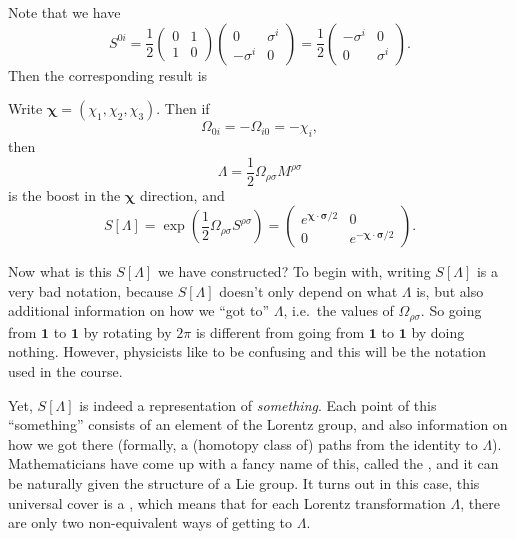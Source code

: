 \documentclass[a4paper]{article}
\begin{document}
Note that we have
\[
  S^{0i} = \frac{1}{2}
  \begin{pmatrix}
    0 & 1\\
    1 & 0
  \end{pmatrix}
  \begin{pmatrix}
    0 & \sigma^i\\
    -\sigma^i & 0
  \end{pmatrix}=
  \frac{1}{2}
  \begin{pmatrix}
    -\sigma^i & 0\\
    0 & \sigma^i
  \end{pmatrix}.
\]
Then the corresponding result is
\begin{prop}
  Write $\boldsymbol\chi = (\chi_1, \chi_2, \chi_3)$. Then if
  \[
    \Omega_{0i} = -\Omega_{i0} = -\chi_i,
  \]
  then
  \[
    \Lambda = \frac{1}{2} \Omega_{\rho\sigma}M^{\rho\sigma}
  \]
  is the boost in the $\boldsymbol\chi$ direction, and
  \[
    S[\Lambda] = \exp\left(\frac{1}{2} \Omega_{\rho\sigma} S^{\rho \sigma}\right) =
    \begin{pmatrix}
      e^{\boldsymbol\chi \cdot \boldsymbol\sigma/2} & 0\\
      0 & e^{-\boldsymbol\chi \cdot \boldsymbol\sigma/2}
    \end{pmatrix}.
  \]
\end{prop}

Now what is this $S[\Lambda]$ we have constructed? To begin with, writing $S[\Lambda]$ is a very bad notation, because $S[\Lambda]$ doesn't only depend on what $\Lambda$ is, but also additional information on how we ``got to'' $\Lambda$, i.e.\ the values of $\Omega_{\rho\sigma}$. So going from $\mathbf{1}$ to $\mathbf{1}$ by rotating by $2\pi$ is different from going from $\mathbf{1}$ to $\mathbf{1}$ by doing nothing. However, physicists like to be confusing and this will be the notation used in the course.

Yet, $S[\Lambda]$ is indeed a representation of \emph{something}. Each point of this ``something'' consists of an element of the Lorentz group, and also information on how we got there (formally, a (homotopy class of) paths from the identity to $\Lambda$). Mathematicians have come up with a fancy name of this, called the , and it can be naturally given the structure of a Lie group. It turns out in this case, this universal cover is a , which means that for each Lorentz transformation $\Lambda$, there are only two non-equivalent ways of getting to $\Lambda$.
\end{document}
